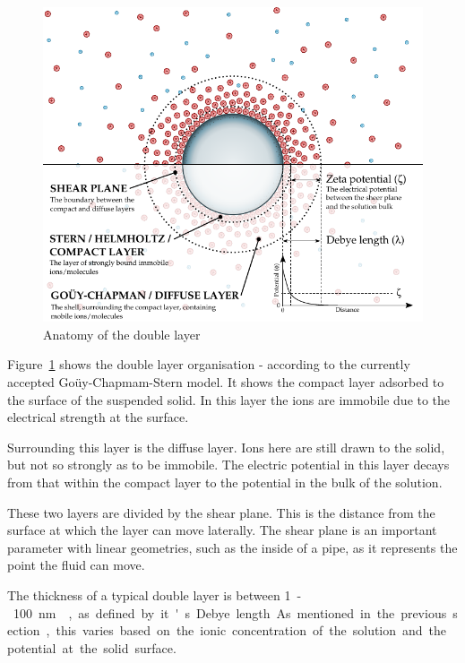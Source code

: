     \begin{figure}
      \begin{center}
        \includegraphics{content/introduction/graphics/doubleLayer_version2}
      \end{center}
      \caption{Anatomy of the double layer}
      \label{fig:doubleLayer_anatomy}
    \end{figure}

    Figure~\ref{fig:doubleLayer_anatomy} shows the double layer organisation - according to the currently accepted Goüy-Chapmam-Stern model.
    It shows the compact layer adsorbed to the surface of the suspended solid.
    In this layer the ions are immobile due to the electrical strength at the surface.
    
    Surrounding this layer is the diffuse layer.
    Ions here are still drawn to the solid, but not so strongly as to be immobile.
    The electric potential in this layer decays from that within the compact layer to the potential in the bulk of the solution.

    These two layers are divided by the shear plane.
    This is the distance from the surface at which the layer can move laterally.
    The shear plane is an important parameter with linear geometries, such as the inside of a pipe, as it represents the point the fluid can move.    

    The thickness of a typical double layer is between \SI{1}-\SI{100}{\nano\meter}~\cite{Jiang2010}, as defined by it's Debye length.
    As mentioned in the previous section, this varies based on the ionic concentration of the solution and the potential at the solid surface.

